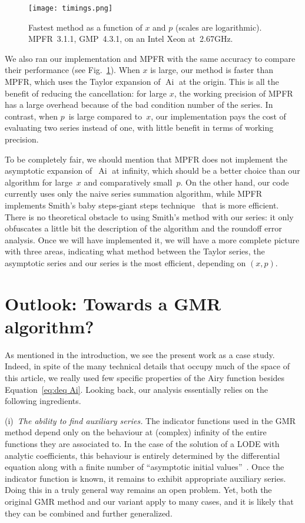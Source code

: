\documentclass[10pt, conference]{IEEEtran}
\DeclareMathOperator{\Ai}{Ai}
\newcommand{\ttarget}{p}
\begin{document}
\begin{figure}
  \centerline{\texttt{[image: timings.png]}}
  \caption{Fastest method as a function of $x$ and $\ttarget$ (scales are logarithmic). MPFR~3.1.1, GMP~4.3.1, on an Intel Xeon at~2.67GHz.\label{fig:comparison with MPFR}}
\end{figure}

We also ran our implementation and MPFR with the same accuracy to compare their performance (see Fig.~\ref{fig:comparison with MPFR}).
When $x$ is large, our method is faster than MPFR, which uses the Taylor expansion of $\Ai$ at the origin. This is all the benefit of reducing the cancellation: for large $x$, the working precision of MPFR has a large overhead because of the bad condition number of the series.
In contrast, when $\ttarget$~is large compared to~$x$, our implementation pays the cost of evaluating two series instead of one, with little benefit in terms of working precision.

To be completely fair, we should mention that MPFR does not implement the asymptotic expansion of~$\Ai$ at infinity, which should be a better choice than our algorithm for large~$x$ and comparatively small~$\ttarget$. On the other hand, our code currently uses only the naive series summation algorithm, while MPFR implements Smith's baby steps-giant steps technique~\cite{PatersonStockmeyer1973,Smith1989} that is more efficient. There is no theoretical obstacle to using Smith's method with our series: it only obfuscates a little bit the description of the algorithm and the roundoff error analysis. Once we will have implemented it, we will have a more complete picture with three areas, indicating what method between the Taylor series, the asymptotic series and our series is the most efficient, depending on $(x,\ttarget)$.

\section{Outlook: Towards a GMR algorithm?}
\label{sec:conclusion}

As mentioned in the introduction, we see the present work as a case study.
Indeed, in spite of the many technical details that occupy much of the space of this article, we really used few specific properties of the Airy function besides Equation~\eqref{eq:deq Ai}.
Looking back, our analysis essentially relies on the following ingredients.

(i)~\emph{The ability to find auxiliary series.}
The indicator functions used in the GMR method depend only on the behaviour at (complex) infinity of the entire functions they are associated to.
In the case of the solution of a LODE with analytic coefficients, this behaviour is entirely determined by the differential equation along with a finite number of ``asymptotic initial values''~\cite{Wasow1965,vdPutSinger2003}.
Once the indicator function is known, it remains to exhibit appropriate auxiliary series.
Doing this in a truly general way remains an open problem.
Yet, both the original GMR method and our variant apply to many cases, and it is likely that they can be combined and further generalized.
\end{document}
